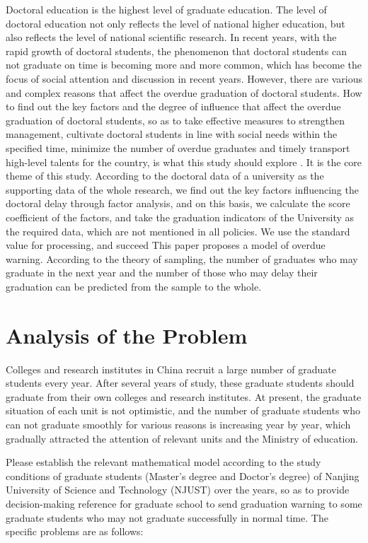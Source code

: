 \documentclass{mcmthesis}
\begin{document}
Doctoral education is the highest level of graduate education. The level of
doctoral education not only reflects the level of national higher education, but
also reflects the level of national scientific research. In recent years, with
the rapid growth of doctoral students, the phenomenon that doctoral students can
not graduate on time is becoming more and more common, which has become the
focus of social attention and discussion in recent years. However, there are
various and complex reasons that affect the overdue graduation of doctoral
students. How to find out the key factors and the degree of influence that
affect the overdue graduation of doctoral students, so as to take effective
measures to strengthen management, cultivate doctoral students in line with
social needs within the specified time, minimize the number of overdue graduates
and timely transport high-level talents for the country, is what this study
should explore . It is the core theme of this study. According to the doctoral
data of a university as the supporting data of the whole research, we find out
the key factors influencing the doctoral delay through factor analysis, and on
this basis, we calculate the score coefficient of the factors, and take the
graduation indicators of the University as the required data, which are not
mentioned in all policies. We use the standard value for processing, and succeed
This paper proposes a model of overdue warning. According to the theory of
sampling, the number of graduates who may graduate in the next year and the
number of those who may delay their graduation can be predicted from the sample
to the whole.
\cite{Wang2013Research,Yan2009Research,Wang2009Research}

\section{Analysis of the Problem}%
\label{sec:Analysis of the Problem}

Colleges and research institutes in China recruit a large number of graduate
students every year. After several years of study, these graduate students
should graduate from their own colleges and research institutes. At present, the
graduate situation of each unit is not optimistic, and the number of graduate
students who can not graduate smoothly for various reasons is increasing year by
year, which gradually attracted the attention of relevant units and the Ministry
of education.

Please establish the relevant mathematical model according to the study
conditions of graduate students (Master's degree and Doctor's degree) of Nanjing
University of Science and Technology (NJUST) over the years, so as to provide
decision-making reference for graduate school to send graduation warning to some
graduate students who may not graduate successfully in normal time. The specific
problems are as follows:
\end{document}
